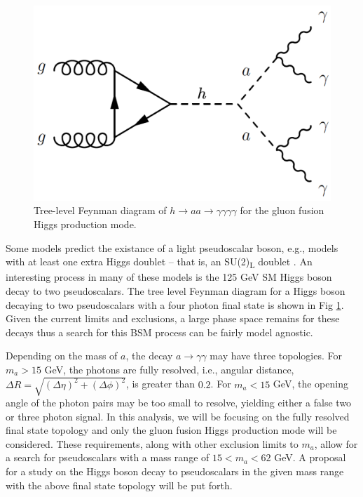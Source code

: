 \documentclass[12pt]{article}
\begin{document}
\begin{figure}
   \centering
   \includegraphics[width=0.45\linewidth]{figures/h4g-feynman-diagram.png}
   \caption{Tree-level Feynman diagram of $h\rightarrow aa \rightarrow \gamma\gamma\gamma\gamma$ for the gluon fusion Higgs production mode.}
   \label{fig:h4g-feynman-diag}
\end{figure}

Some models predict the existance of a light pseudoscalar boson, e.g., models with at least one extra Higgs doublet -- that is, an SU(2)\textsubscript{L} doublet \cite{Curtin_2014}. An interesting process in many of these models is the 125 GeV SM Higgs boson decay to two pseudoscalars. The tree level Feynman diagram for a Higgs boson decaying to two pseudoscalars with a four photon final state is shown in Fig \ref{fig:h4g-feynman-diag}. Given the current limits and exclusions, a large phase space remains for these decays thus a search for this BSM process can be fairly model agnostic.\par

Depending on the mass of $a$, the decay $a\rightarrow \gamma\gamma$ may have three topologies. For $m_{a} > 15$ GeV, the photons are fully resolved, i.e., angular distance, $\Delta R = \sqrt{(\Delta \eta)^2 + (\Delta \phi)^2}$, is greater than $0.2$. For $m_{a} < 15$ GeV, the opening angle of the photon pairs may be too small to resolve, yielding either a false two or three photon signal. In this analysis, we will be focusing on the fully resolved final state topology and only the gluon fusion Higgs production mode will be considered. These requirements, along with other exclusion limits to $m_{a}$, allow for a search for pseudoscalars with a mass range of $15 < m_{a} < 62$ GeV. A proposal for a study on the Higgs boson decay to pseudoscalars in the given mass range with the above final state topology will be put forth.\par
\end{document}
